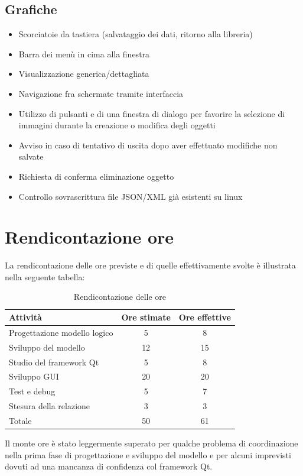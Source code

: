 \documentclass[a4paper,10pt]{article}
\begin{document}
\subsection*{Grafiche}
\begin{itemize}
    \item Scorciatoie da tastiera (salvataggio dei dati, ritorno alla libreria)
    \item Barra dei menù in cima alla finestra
    \item Visualizzazione generica/dettagliata
    \item Navigazione fra schermate tramite interfaccia
    \item Utilizzo di pulsanti e di una finestra di dialogo per favorire la selezione di immagini durante la creazione o modifica degli oggetti
    \item Avviso in caso di tentativo di uscita dopo aver effettuato modifiche non salvate
    \item Richiesta di conferma eliminazione oggetto
    \item Controllo sovrascrittura file JSON/XML già esistenti su linux
\end{itemize}

\section{Rendicontazione ore}
La rendicontazione delle ore previste e di quelle effettivamente svolte è illustrata nella seguente tabella:

\begin{table}[H]
\centering
\begin{tabular}{|l|c|c|}
  \hline
  Attività & Ore stimate & Ore effettive\\ \hline
  Progettazione modello logico & 5 & 8\\
  Sviluppo del modello & 12 & 15\\
  Studio del framework Qt & 5 & 8\\ 
  Sviluppo GUI &20 &20\\
  Test e debug & 5 & 7\\
  Stesura della relazione & 3 & 3\\ \hline
  Totale & 50 & 61\\ \hline
\end{tabular}
\caption{Rendicontazione delle ore}
\label{tab:esempio}
\end{table}
Il monte ore è stato leggermente superato per qualche problema di coordinazione nella prima fase di progettazione e sviluppo del modello e per alcuni imprevisti dovuti ad una mancanza di confidenza col framework Qt.
\end{document}
